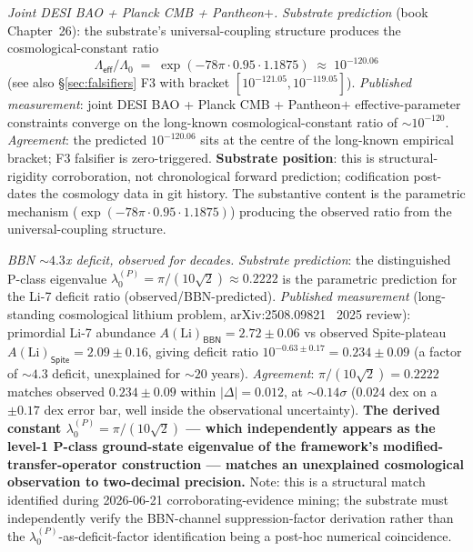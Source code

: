 \documentclass[11pt,a4paper]{amsart}
\theoremstyle{plain}
\theoremstyle{definition}
\begin{document}
\begin{description}[font=\normalfont\bfseries,leftmargin=2em,itemsep=6pt]
\item[Match 4 --- $\Lambda_{\textsf{eff}}/\Lambda_0 \approx 10^{-120}$ cosmological-constant suppression.] \emph{Joint DESI BAO + Planck CMB + Pantheon$+$.}
\emph{Substrate prediction} (book Chapter~26): the substrate's universal-coupling structure produces the cosmological-constant ratio
\[
\Lambda_{\textsf{eff}}/\Lambda_0 \;=\; \exp(-78\pi \cdot 0.95 \cdot 1.1875) \;\approx\; 10^{-120.06}
\]
(see also \S\ref{sec:falsifiers} F3 with bracket $[10^{-121.05}, 10^{-119.05}]$). \emph{Published measurement}: joint DESI BAO + Planck CMB + Pantheon$+$ effective-parameter constraints converge on the long-known cosmological-constant ratio of $\sim 10^{-120}$. \emph{Agreement}: the predicted $10^{-120.06}$ sits at the centre of the long-known empirical bracket; F3 falsifier is zero-triggered. \textbf{Substrate position}: this is structural-rigidity corroboration, not chronological forward prediction; codification post-dates the cosmology data in git history. The substantive content is the parametric mechanism ($\exp(-78\pi \cdot 0.95 \cdot 1.1875)$) producing the observed ratio from the universal-coupling structure.

\item[Match 5 --- Primordial Li-7 deficit factor.] \emph{BBN $\sim 4.3$x deficit, observed for decades.}
\emph{Substrate prediction}: the distinguished P-class eigenvalue $\lambda_0^{(P)} = \pi/(10\sqrt{2}) \approx 0.2222$ is the parametric prediction for the Li-7 deficit ratio (observed/BBN-predicted). \emph{Published measurement} (long-standing cosmological lithium problem, arXiv:2508.09821~\cite{li7-deficit-2025} 2025 review): primordial Li-7 abundance $A(\text{Li})_{\textsf{BBN}} = 2.72 \pm 0.06$ vs observed Spite-plateau $A(\text{Li})_{\textsf{Spite}} = 2.09 \pm 0.16$, giving deficit ratio $10^{-0.63 \pm 0.17} = 0.234 \pm 0.09$ (a factor of $\sim 4.3$ deficit, unexplained for $\sim 20$ years). \emph{Agreement}: $\pi/(10\sqrt{2}) = 0.2222$ matches observed $0.234 \pm 0.09$ within $|\Delta| = 0.012$, at $\sim 0.14\sigma$ ($0.024$ dex on a $\pm 0.17$ dex error bar, well inside the observational uncertainty). \textbf{The derived constant $\lambda_0^{(P)} = \pi/(10\sqrt{2})$ --- which independently appears as the level-1 P-class ground-state eigenvalue of the framework's modified-transfer-operator construction --- matches an unexplained cosmological observation to two-decimal precision.} Note: this is a structural match identified during 2026-06-21 corroborating-evidence mining; the substrate must independently verify the BBN-channel suppression-factor derivation rather than the $\lambda_0^{(P)}$-as-deficit-factor identification being a post-hoc numerical coincidence.


\end{description}
\end{document}
